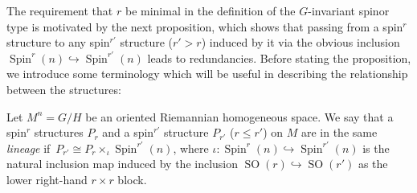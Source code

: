 \documentclass[pdftex]{sigma}
\numberwithin{equation}{section}
\DeclareMathOperator{\SO}{SO}
\DeclareMathOperator{\Spin}{Spin}
\begin{document}
		The requirement that $r$ be minimal in the definition of the $G$-invariant spinor type is motivated by the next proposition, which shows that passing from a spin$^r$ structure to any spin$^{r'}$ structure ($r'>r$) induced by it via the obvious inclusion $\Spin^r(n) \hookrightarrow \Spin^{r'}(n)$ leads to redundancies. Before stating the proposition, we introduce some terminology which will be useful in describing the relationship between the structures:
		\begin{Definition}
			Let $M^n=G/H$ be an oriented Riemannian homogeneous space. We say that a spin$^r$ structures $P_r$ and a spin$^{r'}$ structure $P_{r'}$ ($r\leq r'$) on $M$ are in the same \emph{lineage} if~${P_{r'} \cong P_r \times_{\iota} \Spin^{r'}(n)}$, where $\iota\colon \Spin^r(n) \hookrightarrow \Spin^{r'}(n)$ is the natural inclusion map induced by the inclusion $\SO(r) \hookrightarrow \SO(r')$ as the lower right-hand $r\times r$ block.
		\end{Definition}
		
\end{document}
